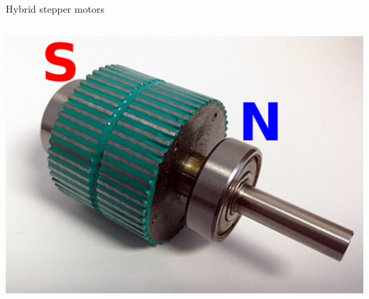 \documentclass[compress]{beamer}
\begin{document}
\begin{frame}{Hybrid stepper motors}
\begin{columns}
\begin{column}{0.4\linewidth}
\begin{center}
                \includegraphics[width=0.9\linewidth]{magnetized-shaft}
            \end{center}
        \end{column}
    \end{columns}

\end{frame}
\end{document}
